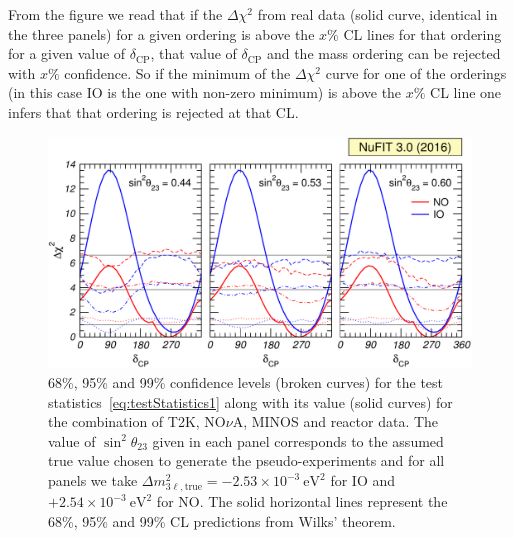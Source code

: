 \documentclass[a4paper, 11pt]{article}
\newcommand{\Dmq}{\Delta m^2}
\begin{document}
From the figure we read that if the $\Delta\chi^2$ from real data
(solid curve, identical in the three panels) for a given ordering is
above the $x\%$ CL lines for that ordering for a given value of
$\delta_\text{CP}$, that value of $\delta_\text{CP}$ and the mass
ordering can be rejected with $x\%$ confidence. So if the minimum of
the $\Delta\chi^2$ curve for one of the orderings (in this case IO is
the one with non-zero minimum) is above the $x\%$ CL line one infers
that that ordering is rejected at that CL.

\begin{figure}\centering
  \includegraphics[width=\textwidth]{fig-probab-dcp}
  \caption{68\%, 95\% and 99\% confidence levels (broken curves) for
    the test statistics~\eqref{eq:testStatistics1} along with its
    value (solid curves) for the combination of T2K, NO$\nu$A, MINOS
    and reactor data.  The value of $\sin^2\theta_{23}$ given in each
    panel corresponds to the assumed true value chosen to generate the
    pseudo-experiments and for all panels we take
    $\Dmq_{3\ell,\text{true}} = -2.53 \times 10^{-3}~\text{eV}^2$ for
    IO and $+2.54 \times 10^{-3}~\text{eV}^2$ for NO.  The solid
    horizontal lines represent the 68\%, 95\% and 99\% CL predictions
    from Wilks' theorem.}
  \label{fig:probab-dcp}
\end{figure}
\end{document}
